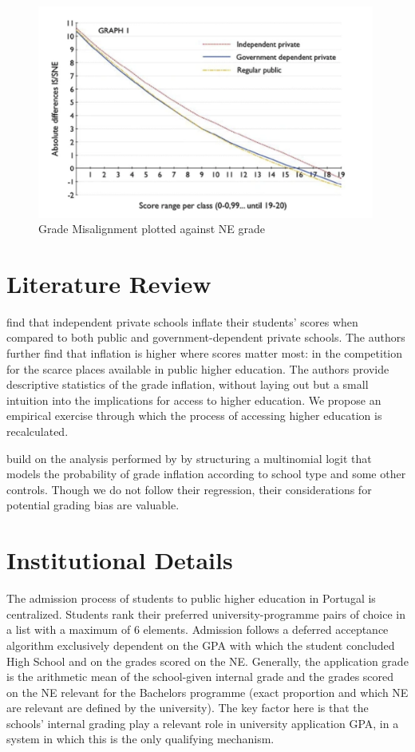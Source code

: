 \documentclass{article}
\begin{document}
\begin{figure}[ht]
  \centering
  \includegraphics[height=7cm, keepaspectratio]{Figures/Inflation_Nata.png}
  \caption{Grade Misalignment plotted against NE grade \citep{nata2014unfairness}}
  \label{fig: Inflation_Nata}
\end{figure}



\section{Literature Review}

\cite{nata2014unfairness} find that independent private schools inflate their students’ scores when compared to both public and government-dependent private schools. The authors further find that inflation is higher where scores matter most: in the competition for the scarce places available in public higher education. The authors provide descriptive statistics of the grade inflation, without laying out but a small intuition into the implications for access to higher education. We propose an empirical exercise through which the process of accessing higher education is recalculated.

\cite{silva2025public} build on the analysis performed by \cite{nata2014unfairness} by structuring a multinomial logit that models the probability of grade inflation according to school type and some other controls. Though we do not follow their regression, their considerations for potential grading bias are valuable.


\section{Institutional Details}
The admission process of students to public higher education in Portugal is centralized. Students rank their preferred university-programme pairs of choice in a list with a maximum of 6 elements. Admission follows a deferred acceptance algorithm exclusively dependent on the GPA with which the student concluded High School and on the grades scored on the NE. Generally, the application grade is the arithmetic mean of the school-given internal grade and the grades scored on the NE relevant for the Bachelors programme (exact proportion and which NE are relevant are defined by the university). The key factor here is that the schools' internal grading play a relevant role in university application GPA, in a system in which this is the only qualifying mechanism.
\end{document}
